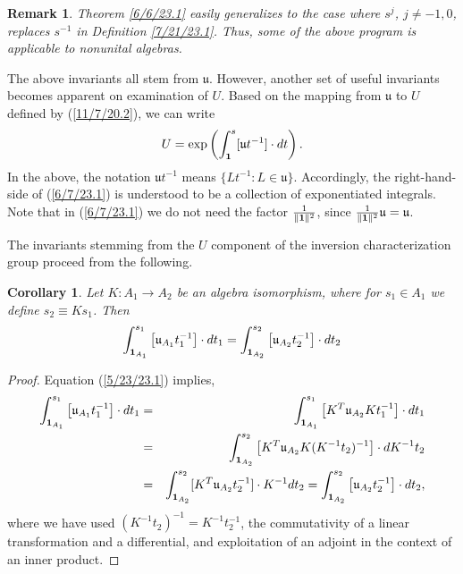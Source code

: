 \documentclass{amsart}
\numberwithin{equation}{section}
\newtheorem{remark}[theorem]{Remark}
\newtheorem{corollary}[theorem]{Corollary}
\theoremstyle{definition}
\numberwithin{theorem}{section}
\begin{document}
\begin{remark} {\rm Theorem \ref{6/6/23.1} easily generalizes to the case where $s^j$, $j\ne -1,0$, replaces $s^{-1}$ in Definition \ref{7/21/23.1}.  Thus, some of the above program is applicable to nonunital algebras. } \end{remark}


The above invariants all stem from $\mathfrak{u}$.  However, another set of useful invariants becomes apparent on examination of $ U$.  Based on the mapping from $\mathfrak{u}$ to $ U$ defined by (\ref{11/7/20.2}),  we can write \begin{equation}  U = \exp\left(\int_{\bf 1}^s [\mathfrak{u}t^{-1}]\cdot dt\right). \label{6/7/23.1}\end{equation}  In the above, the notation $\mathfrak{u}t^{-1}$ means $\{Lt^{-1}: L\in \mathfrak{u}\}$.  Accordingly, the right-hand-side of (\ref{6/7/23.1}) is understood to be a collection of exponentiated integrals.   Note that in (\ref{6/7/23.1}) we do not need the factor $\frac{1}{\|{\bf 1}\|^2}$, since $\frac{1}{\|{\bf 1}\|^2}\mathfrak{u}=\mathfrak{u}$.  

The invariants stemming from the $U$ component of the inversion characterization group proceed from the following. 


\begin{corollary}\label{6/6/23.2} Let $K:A_1\rightarrow A_2$ be an algebra isomorphism, where for $s_1\in A_1$ we define $s_2\equiv Ks_1$.  Then \[ \int_{{\bf 1}_{A_1}}^{s_1} \left[\mathfrak{u}_{A_1}t_1^{-1}\right]\cdot dt_1 
= \int_{{\bf 1}_{A_2}}^{s_2} \left[\mathfrak{u}_{A_2}t_2^{-1}\right]\cdot dt_2  \] \end{corollary}

\begin{proof} 
Equation (\ref{5/23/23.1}) implies,
\begin{eqnarray*} \int_{{\bf 1}_{A_1}}^{s_1} \left[\mathfrak{u}_{A_1}t_1^{-1}\right]\cdot dt_1 &=& \int_{{\bf 1}_{A_1}}^{s_1} \left[ K^T\mathfrak{u}_{A_2}Kt_1^{-1}\right]\cdot dt_1 \\ &=& 
\int_{{\bf 1}_{A_2}}^{s_2} \left[ K^T\mathfrak{u}_{A_2}K (K^{-1}t_2)^{-1}\right]\cdot dK^{-1}t_2 \\ &=& \int_{{\bf 1}_{A_2}}^{s_2} [K^T\mathfrak{u}_{A_2}t_2^{-1}]\cdot K^{-1}dt_2 = \int_{{\bf 1}_{A_2}}^{s_2} \left[\mathfrak{u}_{A_2}t_2^{-1}\right]\cdot dt_2, 
\end{eqnarray*}
where we have used $(K^{-1}t_2)^{-1} = K^{-1}t_2^{-1}$, the commutativity of a linear transformation and a differential, and exploitation of an adjoint in the context of an inner product.
\end{proof}
\end{document}
